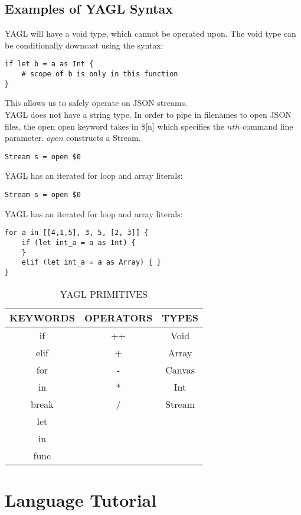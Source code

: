 \documentclass[12pt]{article}
\begin{document}
\subsection{Examples of YAGL Syntax}
YAGL will have a void type, which cannot be operated upon. The void type can be conditionally downcast using the syntax:
\begin{lstlisting}
if let b = a as Int {
	# scope of b is only in this function 
}
\end{lstlisting}
This allows us to safely operate on JSON streams.\\

YAGL does not have a string type. In order to pipe in filenames to open JSON files, the open open keyword takes in \$[n] which specifies the $n{th}$ command line parameter. $open$ constructs a Stream.
\begin{lstlisting}
Stream s = open $0
\end{lstlisting}

YAGL has an iterated for loop and array literals:
\begin{lstlisting}
Stream s = open $0
\end{lstlisting}
YAGL has an iterated for loop and array literals:
\begin{lstlisting}
for a in [[4,1,5], 3, 5, [2, 3]] {
	if (let int_a = a as Int) {
	}
	elif (let int_a = a as Array) { }
}
\end{lstlisting}
\begin{table}[H]
\caption{YAGL PRIMITIVES}
\centering
\begin{tabular}{c c c }
\hline\hline
KEYWORDS & OPERATORS & TYPES \\ [0.5ex] %
\hline
if&++&Void \\
elif&+&Array \\
for&-&Canvas \\
in&*&Int \\
break&/&Stream \\
let\\
in\\
func \\

\hline
\end{tabular}
\end{table}



\section{Language Tutorial}
\end{document}
